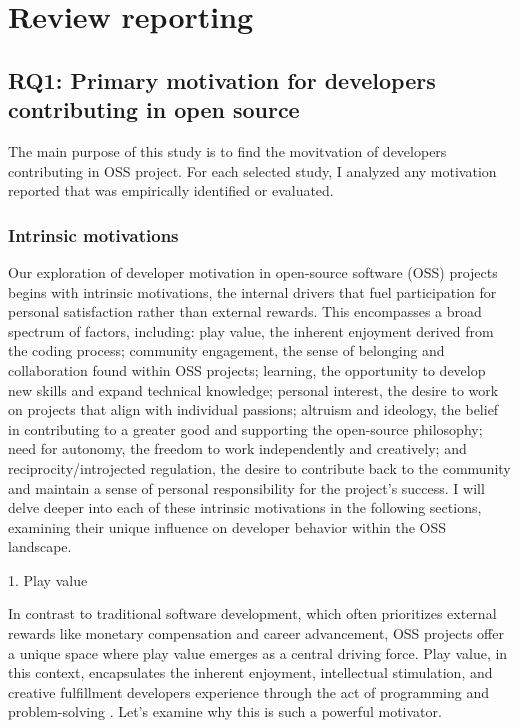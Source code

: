 \section{Review reporting}
\subsection{RQ1: Primary motivation for developers contributing in open source}
The main purpose of this study is to find the movitvation of developers contributing in OSS project. For each selected study, I analyzed any motivation reported that was empirically identified or evaluated.

\subsubsection{Intrinsic motivations}
Our exploration of developer motivation in open-source software (OSS) projects begins with intrinsic motivations, the internal drivers that fuel participation for personal satisfaction rather than external rewards. This encompasses a broad spectrum of factors, including: play value, the inherent enjoyment derived from the coding process; community engagement, the sense of belonging and collaboration found within OSS projects; learning, the opportunity to develop new skills and expand technical knowledge; personal interest, the desire to work on projects that align with individual passions; altruism and ideology, the belief in contributing to a greater good and supporting the open-source philosophy; need for autonomy, the freedom to work independently and creatively; and reciprocity/introjected regulation, the desire to contribute back to the community and maintain a sense of personal responsibility for the project's success. I will delve deeper into each of these intrinsic motivations in the following sections, examining their unique influence on developer behavior within the OSS landscape.

1. Play value

In contrast to traditional software development, which often prioritizes external rewards like monetary compensation and career advancement, OSS projects offer a unique space where play value emerges as a central driving force. Play value, in this context, encapsulates the inherent enjoyment, intellectual stimulation, and creative fulfillment developers experience through the act of programming and problem-solving \parencite{05bitzer2007intrinsic, 06ye2003toward, 08zhang2024paid, 09lakhani2005hackers, 11gerosa2021shifting, 12choi2015characteristics,13li2012leadership,16ke2008motivations,17alexander2002working, 18oreg2008exploring}. Let's examine why this is such a powerful motivator.

